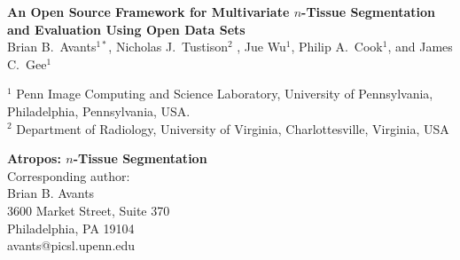 \documentclass[11pt,english]{article}
\begin{document}


\normalem

\vspace*{5cm}

\begin{center}
{\Large \bf An Open Source Framework for Multivariate $n$-Tissue
  Segmentation and Evaluation Using Open Data Sets} \\
\vspace*{0.5cm}
{\normalsize Brian B.~Avants$^{1*}$,  Nicholas J.~Tustison$^2$%
, 
Jue Wu$^1$, Philip A.~Cook$^1$, and James C.~Gee$^1$} \\
\begin{singlespace} 
{\scriptsize  $^1$ Penn Image Computing and Science Laboratory, University of Pennsylvania, Philadelphia, Pennsylvania,  USA.\\
  $^2$ Department of Radiology, University of Virginia, Charlottesville, Virginia, USA}
\end{singlespace}
\end{center}

\vfill

\begin{singlespace} 
\scriptsize
\flushleft
{\bf Atropos:  $n$-Tissue Segmentation}\\
Corresponding author: \\
Brian B. Avants\\
3600 Market Street, Suite 370\\
Philadelphia, PA  19104\\
avants@picsl.upenn.edu\\
\end{singlespace} 

%
%

\clearpage
\end{document}
